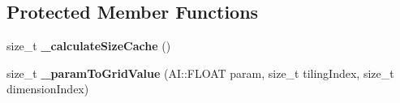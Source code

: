 \subsection*{Protected Member Functions}
\begin{DoxyCompactItemize}
\item 
\hypertarget{classAI_1_1Algorithm_1_1TileCode_a918fe826ad83e42c65bce7abfa35ad58}{size\-\_\-t {\bfseries \-\_\-calculate\-Size\-Cache} ()}\label{classAI_1_1Algorithm_1_1TileCode_a918fe826ad83e42c65bce7abfa35ad58}

\item 
\hypertarget{classAI_1_1Algorithm_1_1TileCode_a89e1188441fe9f07b4f9fa6394003a89}{size\-\_\-t {\bfseries \-\_\-param\-To\-Grid\-Value} (A\-I\-::\-F\-L\-O\-A\-T param, size\-\_\-t tiling\-Index, size\-\_\-t dimension\-Index)}\label{classAI_1_1Algorithm_1_1TileCode_a89e1188441fe9f07b4f9fa6394003a89}

\end{DoxyCompactItemize}
